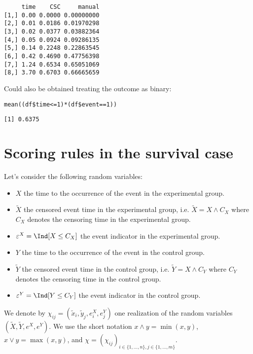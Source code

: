 \documentclass[12pt]{article}
\newcommand\Xobs{\tilde{X}}
\newcommand\Yobs{\tilde{Y}}
\newcommand\xobs{\tilde{x}}
\newcommand\yobs{\tilde{y}}
\newcommand\CensT{\varepsilon^X}
\newcommand\CensC{\varepsilon^Y}
\newcommand\censT{e^X}
\newcommand\censC{e^Y}
\newcommand\sample{\chi}
\begin{document}
\begin{enumerate}
\begin{verbatim}
     time    CSC     manual
[1,] 0.00 0.0000 0.00000000
[2,] 0.01 0.0186 0.01970298
[3,] 0.02 0.0377 0.03882364
[4,] 0.05 0.0924 0.09286135
[5,] 0.14 0.2248 0.22863545
[6,] 0.42 0.4690 0.47756398
[7,] 1.24 0.6534 0.65051069
[8,] 3.70 0.6703 0.66665659
\end{verbatim}

Could also be obtained treating the outcome as binary:
\lstset{language=r,label= ,caption= ,captionpos=b,numbers=none}
\begin{lstlisting}
mean((df$time<=1)*(df$event==1))
\end{lstlisting}

\begin{verbatim}
[1] 0.6375
\end{verbatim}



\clearpage
\end{enumerate}

\section{Scoring rules in the survival case}
\label{sec:orgf63586d}
Let's consider the following random variables:  
\begin{itemize}
\item \(X\) the time to the occurrence of the event in the experimental group.
\item \(\Xobs\) the censored event time in the experimental group,
i.e. \(\Xobs = X \wedge C_X\) where \(C_X\) denotes the censoring time in the experimental group.
\item \(\CensT = \Ind[X \leq C_X]\) the event indicator in the experimental group.
\item \(Y\) the time to the occurrence of the event in the control group.
\item \(\Yobs\) the censored event time in the control group,
i.e. \(\Yobs = X \wedge C_Y\) where \(C_Y\) denotes the censoring time in the control group.
\item \(\CensC = \Ind[Y \leq C_Y]\) the event indicator in the control group.
\end{itemize}

We denote by \(\sample_{ij}=\left(\xobs_{i}, \yobs_{j}, \censT_i, \censC_j
\right)\) one realization of the random variables \(\left(\Xobs,
\Yobs, \censT, \censC \right)\). We use the short notation \(x \wedge
y = \min(x,y)\), \(x \vee y = \max(x,y)\), and \(\sample =
\left(\sample_{ij}\right)_{i \in \{1,\ldots,n\},j \in
\{1,\ldots,m\}}\).
\end{document}
